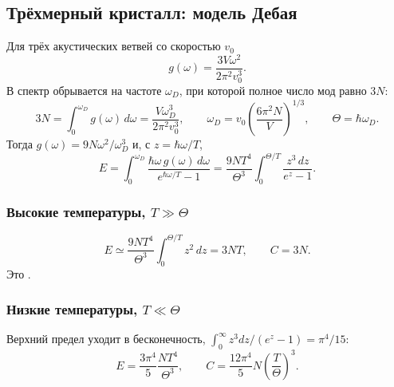 \documentclass[../final.tex]{subfiles}
\begin{document}
\subsection*{Трёхмерный кристалл: модель Дебая}

Для трёх акустических ветвей со скоростью $v_0$
\[
    g(\omega)=\frac{3V\omega^2}{2\pi^2v_0^3}.
\]
В  спектр обрывается на частоте $\omega_D$,
при которой полное число мод равно $3N$:
\[
    3N=\int_0^{\omega_D}g(\omega)\,d\omega
      =\frac{V\omega_D^3}{2\pi^2v_0^3},\qquad
    \omega_D=v_0\left(\frac{6\pi^2N}V\right)^{1/3},\qquad
    \Theta=\hbar\omega_D.
\]
Тогда $g(\omega)=9N\omega^2/\omega_D^3$ и, с $z=\hbar\omega/T$,
\[
    E=\int_0^{\omega_D}\frac{\hbar\omega\,g(\omega)\,d\omega}
        {e^{\hbar\omega/T}-1}
     =\frac{9NT^4}{\Theta^3}\int_0^{\Theta/T}\frac{z^3\,dz}{e^z-1}.
\]

\subsubsection*{Высокие температуры, $T\gg\Theta$}
\[
    E\simeq\frac{9NT^4}{\Theta^3}\int_0^{\Theta/T}z^2\,dz=3NT,
    \qquad C=3N.
\]
Это .

\subsubsection*{Низкие температуры, $T\ll\Theta$}
Верхний предел уходит в бесконечность,
$\int_0^\infty z^3dz/(e^z-1)=\pi^4/15$:
\[
    E=\frac{3\pi^4}{5}\frac{NT^4}{\Theta^3},\qquad
    C=\frac{12\pi^4}{5}N\left(\frac T\Theta\right)^3.
\]
\end{document}
